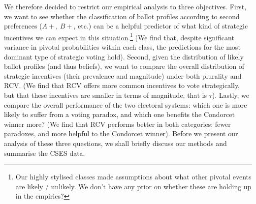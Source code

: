 \documentclass[12pt, letter, margin = 1.5 in]{article}
\begin{document}
We therefore decided to restrict our empirical analysis to three objectives. First, we want to see whether the classification of ballot profiles according to second preferences ($A+$, $B+$, etc.) can be a helpful predictor of what kind of strategic incentives we can expect in this situation.\footnote{Our highly stylised classes made assumptions about what other pivotal events are likely / unlikely. We don't have any prior on whether these are holding up in the empirics?} (We find that, despite significant variance in pivotal probabilities within each class, the predictions for the most dominant type of strategic voting hold). Second, given the distribution of likely ballot profiles (and thus beliefs), we want to compare the overall distribution of strategic incentives (their prevalence and magnitude) under both plurality and RCV. (We find that RCV offers more common incentives to vote strategically, but that these incentives are smaller in terms of magnitude, that is $\tau$). Lastly, we compare the overall performance of the two electoral systems: which one is more likely to suffer from a voting paradox, and which one benefits the Condorcet winner more? (We find that RCV performs better in both categories: fewer paradoxes, and more helpful to the Condorcet winner). Before we present our analysis of these three questions, we shall briefly discuss our methods and summarise the CSES data.




\end{document}
